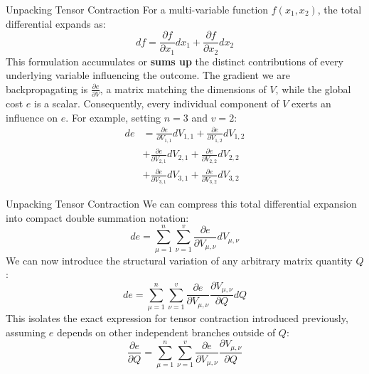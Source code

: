 \begin{frame}{Unpacking Tensor Contraction}
	For a multi-variable function $f(x_1, x_2)$, the total differential expands as:
	\begin{equation*}
		df = \frac{\partial{f}}{\partial{x_1}} dx_1 + \frac{\partial{f}}{\partial{x_2}} dx_2
	\end{equation*}
	\pause
	This formulation accumulates or \textbf{sums up} the distinct contributions of every underlying variable influencing the outcome. The gradient we are backpropagating is $\frac{\partial{e}}{\partial{V}}$, a matrix matching the dimensions of $V$, while the global cost $e$ is a scalar. Consequently, every individual component of $V$ exerts an influence on $e$. For example, setting $n = 3$ and $v = 2$:
	\begin{equation*}
		\begin{aligned}
			de &= \frac{\partial{e}}{\partial{V_{1,1}}} dV_{1,1} + \frac{\partial{e}}{\partial{V_{1,2}}} dV_{1,2} \\
			&+ \frac{\partial{e}}{\partial{V_{2,1}}} dV_{2,1} + \frac{\partial{e}}{\partial{V_{2,2}}} dV_{2,2} \\
			&+ \frac{\partial{e}}{\partial{V_{3,1}}} dV_{3,1} + \frac{\partial{e}}{\partial{V_{3,2}}} dV_{3,2}
		\end{aligned}
	\end{equation*}
\end{frame}

\begin{frame}{Unpacking Tensor Contraction}
	We can compress this total differential expansion into compact double summation notation:
	\begin{equation*}
		de = \sum_{\mu=1}^n \sum_{\nu=1}^v \frac{\partial{e}}{\partial{V_{\mu,\nu}}} dV_{\mu,\nu}
	\end{equation*}
	\pause
	We can now introduce the structural variation of any arbitrary matrix quantity $Q$:
	\begin{equation*}
		de = \sum_{\mu=1}^n \sum_{\nu=1}^v \frac{\partial{e}}{\partial{V_{\mu,\nu}}} \frac{\partial{V}_{\mu,\nu}}{\partial{Q}} dQ 
	\end{equation*}
	\pause
	This isolates the exact expression for tensor contraction introduced previously, assuming $e$ depends on other independent branches outside of $Q$:
	\begin{equation*}
		\frac{\partial{e}}{\partial{Q}} = \sum_{\mu=1}^n \sum_{\nu=1}^v \frac{\partial{e}}{\partial{V_{\mu,\nu}}} \frac{\partial{V}_{\mu,\nu}}{\partial{Q}}
	\end{equation*}
\end{frame}

